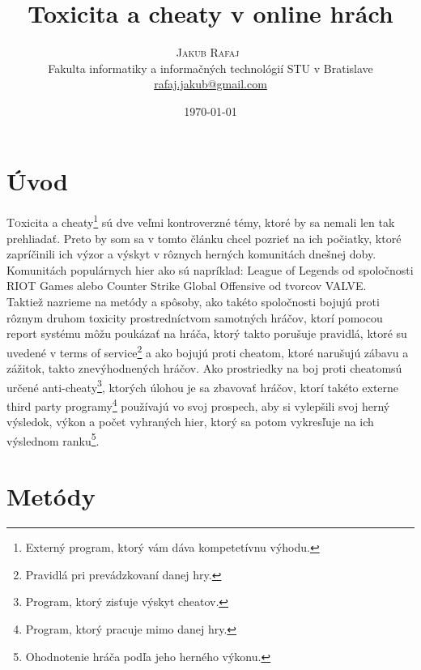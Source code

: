 \documentclass[twoside,twocolumn]{article}
\title{Toxicita a cheaty v online hrách} %
\author{%
\textsc{Jakub Rafaj}\
\\[1ex]
\normalsize Fakulta informatiky a informačných technológií STU v Bratislave  \\%
\normalsize \href{mailto:rafaj.jakub@gmail.com}{rafaj.jakub@gmail.com} %
}
\date{\today} %
\begin{document}
\maketitle

\tableofcontents
\section{Úvod}

\lettrine[nindent=0em,lines=3]{T}oxicita a cheaty\footnote[1]{Externý program, ktorý vám dáva kompetetívnu výhodu.} sú dve veľmi kontroverzné témy, ktoré by sa nemali len tak prehliadať. Preto by som sa v tomto článku chcel pozrieť na ich počiatky, ktoré zapríčinili ich výzor a výskyt v rôznych herných komunitách dnešnej doby. Komunitách populárnych hier ako sú napríklad: League of Legends od spoločnosti RIOT Games alebo Counter Strike Global Offensive od tvorcov VALVE.\\
Taktiež nazrieme na metódy a spôsoby, ako takéto spoločnosti bojujú proti rôznym druhom toxicity prostredníctvom samotných hráčov, ktorí pomocou report systému môžu poukázať na hráča, ktorý takto porušuje pravidlá, ktoré su uvedené v terms of service\footnote[2]{Pravidlá pri prevádzkovaní danej hry.} a ako bojujú proti cheatom\footnotemark[1], ktoré narušujú zábavu a zážitok, takto znevýhodnených hráčov. Ako prostriedky na boj proti cheatom\footnotemark[1] sú určené anti-cheaty\footnote[3]{Program, ktorý zisťuje výskyt cheatov.}, ktorých úlohou je sa zbavovať hráčov, ktorí takéto externe third party programy\footnote[4]{Program, ktorý pracuje mimo danej hry.} používajú vo svoj prospech, aby si vylepšili svoj herný výsledok, výkon a počet vyhraných hier, ktorý sa potom vykresľuje na ich výslednom ranku\footnote[5]{Ohodnotenie hráča podľa jeho herného výkonu.}.\\


\section{Metódy}
\end{document}
